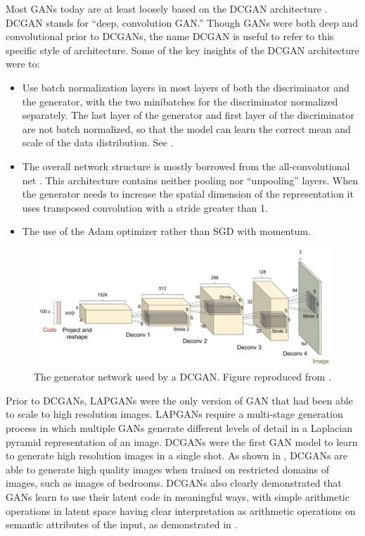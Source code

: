 Most GANs today are at least loosely based on the DCGAN architecture \citep{radford2015unsupervised}.
DCGAN stands for ``deep, convolution GAN.'' Though GANs were both deep and convolutional prior to
DCGANs, the name DCGAN is useful to refer to this specific style of architecture.
Some of the key insights of the DCGAN architecture were to:
\begin{itemize}
  \item Use batch normalization layers in most layers of both the discriminator and the generator,
        with the two minibatches for the discriminator normalized separately.
        The last layer of the generator and first layer of the discriminator are not batch normalized,
        so that the model can learn the correct mean and scale of the data distribution.
        See .
  \item The overall network structure is mostly borrowed from the all-convolutional net \citep{Springenberg2015}.
        This architecture contains neither pooling nor ``unpooling'' layers.
        When the generator needs to increase the spatial dimension of the representation
        it uses transposed convolution with a stride greater than 1.
  \item The use of the Adam optimizer rather than SGD with momentum.
\end{itemize}

\begin{figure}
\centering
\includegraphics[width=\textwidth]{dcgan}
  \caption{The generator network used by a DCGAN. Figure reproduced from \citet{radford2015unsupervised}.}
\label{fig:dcgan}
\end{figure}

Prior to DCGANs, LAPGANs \citep{denton2015deep} were the only version of GAN
that had been able to scale to high resolution images.
LAPGANs require a multi-stage generation process in which multiple GANs
generate different levels of detail in a Laplacian pyramid representation
of an image.
DCGANs were the first GAN model to learn to generate high resolution images
in a single shot.
As shown in , DCGANs are able to generate high quality
images when trained on restricted domains of images, such as images of bedrooms.
DCGANs also clearly demonstrated that GANs learn to use their latent code
in meaningful ways, with simple arithmetic operations in latent space
having clear interpretation as arithmetic operations on semantic attributes
of the input, as demonstrated in .



